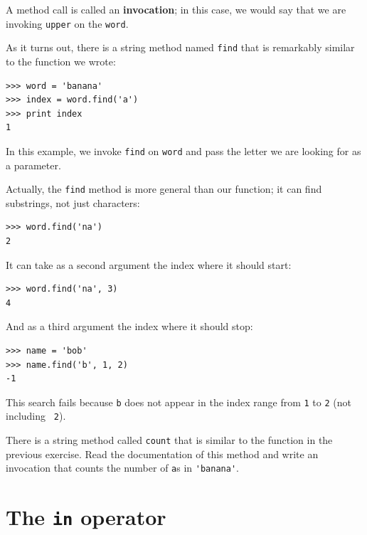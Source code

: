 \documentclass[10pt]{book}
\begin{document}

A method call is called an {\bf invocation}; in this case, we would
say that we are invoking {\tt upper} on the {\tt word}.


As it turns out, there is a string method named {\tt find} that
is remarkably similar to the function we wrote:

\beforeverb
\begin{verbatim}
>>> word = 'banana'
>>> index = word.find('a')
>>> print index
1
\end{verbatim}
\afterverb
%
In this example, we invoke {\tt find} on {\tt word} and pass
the letter we are looking for as a parameter.

Actually, the {\tt find} method is more general than our function;
it can find substrings, not just characters:

\beforeverb
\begin{verbatim}
>>> word.find('na')
2
\end{verbatim}
\afterverb
%
It can take as a second argument the index where it should start:


\beforeverb
\begin{verbatim}
>>> word.find('na', 3)
4
\end{verbatim}
\afterverb
%
And as a third argument the index where it should stop:

\beforeverb
\begin{verbatim}
>>> name = 'bob'
>>> name.find('b', 1, 2)
-1
\end{verbatim}
\afterverb
%
This search fails because {\tt b} does not
appear in the index range from {\tt 1} to {\tt 2} (not including {\tt
2}).


\begin{ex}

There is a string method called {\tt count} that is similar
to the function in the previous exercise.  Read the documentation
of this method
and write an invocation that counts the number of {\tt a}s
in \verb"'banana'".
\end{ex}


\section{The {\tt in} operator}
\label{inboth}
\end{document}
